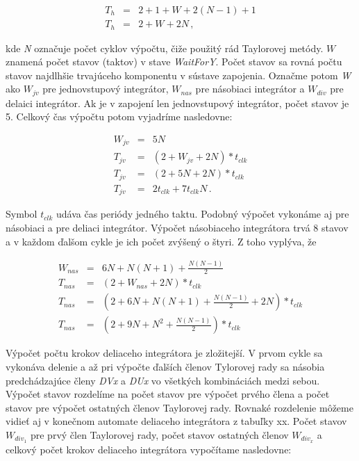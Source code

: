 \begin{eqnarray}
T_h & = & 2 + 1 + W + 2(N-1) + 1 \nonumber \\
T_h & = & 2 + W + 2N \, , \label{hkontrolerrovnica}
\end{eqnarray}

kde \textit{N} označuje počet cyklov výpočtu, čiže použitý rád Taylorovej metódy. $ W $ znamená počet stavov (taktov) v stave \textit{WaitForY}. Počet stavov sa rovná počtu stavov najdlhšie trvajúceho komponentu v sústave zapojenia. Označme potom \textit{W} ako $ W_{jv} $ pre jednovstupový integrátor, $ W_{nas} $ pre násobiaci integrátor a $ W_{div} $ pre delaici integrátor.
Ak je v zapojení len jednovstupový integrátor, počet stavov je 5. Celkový čas výpočtu potom vyjadríme nasledovne:

\begin{eqnarray}
W_{jv} & = & 5N \nonumber \\ 
T_{jv} & = & (2 + W_{jv} + 2N)*t_{clk} \nonumber \\ 
T_{jv} & = & (2 + 5N + 2N)*t_{clk} \nonumber \\
T_{jv} & = & 2t_{clk} + 7t_{clk}N \, .
\end{eqnarray}

Symbol $ t_{clk} $ udáva čas periódy jedného taktu. Podobný výpočet vykonáme aj pre násobiaci a pre deliaci integrátor. 
Výpočet násobiaceho integrátora trvá 8 stavov a v každom ďalšom cykle je ich počet zvýšený o štyri. Z toho vyplýva, že

\begin{eqnarray}
W_{nas} & = & 6N + N(N+1) + \frac{N(N-1)}{2}  \nonumber \\
T_{nas} & = & (2 + W_{nas} + 2N)*t_{clk} \nonumber \\ 
T_{nas} & = & (2 + 6N + N(N+1) + \frac{N(N-1)}{2} + 2N)*t_{clk} \nonumber \\
T_{nas} & = & (2 + 9N + N^2 + \frac{N(N-1)}{2})*t_{clk}
\end{eqnarray}

Výpočet počtu krokov deliaceho integrátora je zložitejší. V prvom cykle sa vykonáva delenie a až pri výpočte ďalších členov Tylorovej rady sa násobia predchádzajúce členy \textit{DVx} a \textit{DUx} vo všetkých kombináciách medzi sebou. Výpočet stavov rozdelíme na počet stavov pre výpočet prvého člena a počet stavov pre výpočet ostatných členov Taylorovej rady. Rovnaké rozdelenie môžeme vidieť aj v konečnom automate deliaceho integrátora z tabuľky xx. Počet stavov $ W_{div_1} $ pre prvý člen Taylorovej rady, počet stavov ostatných členov $ W_{div_x} $ a celkový počet krokov deliaceho integrátora vypočítame nasledovne:

